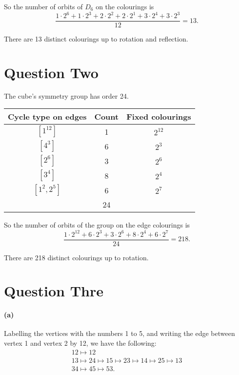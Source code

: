 So the number of orbits of $ D_6 $ on the colourings is
\begin{displaymath}
  \frac{1 \cdot 2^6 + 1 \cdot 2^3 + 2 \cdot 2^2 + 2 \cdot 2^1 + 3 \cdot 2^4 + 3 \cdot 2^3}{12} = 13.
\end{displaymath}

There are 13 distinct colourings up to rotation and reflection.

\section*{Question Two}
The cube's symmetry group has order 24.
\begin{center}\begin{tabular}{|c|c|c|}\hline
  \textbf{Cycle type on edges} & \textbf{Count} & \textbf{Fixed colourings}\\\hline
  $[1^{12}]$ & 1 & $ 2^{12} $\\
  $[4^3]$ & 6 & $ 2^3 $\\
  $[2^6]$ & 3 & $ 2^6 $\\
  $[3^4]$ & 8 & $ 2^4 $\\
  $[1^2,2^5]$ & 6 & $ 2^7 $\\\hline
   & 24 &\\\hline
\end{tabular}\end{center}

So the number of orbits of the group on the edge colourings is
\begin{displaymath}
  \frac{1 \cdot 2^{12} + 6 \cdot 2^3 + 3 \cdot 2^6 + 8 \cdot 2^4 + 6 \cdot 2^7}{24} = 218.
\end{displaymath}

There are 218 distinct colourings up to rotation.

\section*{Question Thre}
\paragraph{(a)}
Labelling the vertices with the numbers 1 to 5, and writing the edge between vertex 1 and vertex 2 by 12, we have the following:
\begin{gather*}
  12 \mapsto 12\\
  13 \mapsto 24 \mapsto 15 \mapsto 23 \mapsto 14 \mapsto 25 \mapsto 13\\
  34 \mapsto 45 \mapsto 53.
\end{gather*}

